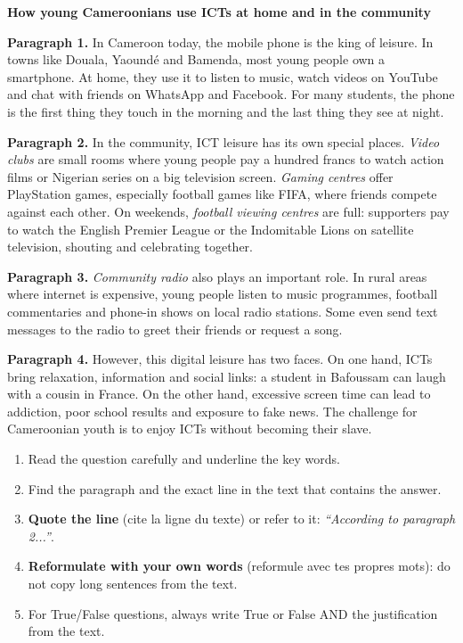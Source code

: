 \documentclass[11pt]{article}
\newcounter{popsec}
\newcounter{popsub}
\newcommand{\courssub}[1]{%
  \stepcounter{popsub}%
  \par\vspace{9pt}\noindent{\popxbold\fontsize{11.5}{13}\selectfont\color{popink}{\color{poporange}\thepopsec.\thepopsub}\hspace{6pt}#1}\par\nopagebreak\vspace{4pt}
}
\begin{document}
\begin{exemplebox}
\textbf{How young Cameroonians use ICTs at home and in the community}

\textbf{Paragraph 1.} In Cameroon today, the mobile phone is the king of leisure. In towns like Douala, Yaoundé and Bamenda, most young people own a smartphone. At home, they use it to listen to music, watch videos on YouTube and chat with friends on WhatsApp and Facebook. For many students, the phone is the first thing they touch in the morning and the last thing they see at night.

\textbf{Paragraph 2.} In the community, ICT leisure has its own special places. \emph{Video clubs} are small rooms where young people pay a hundred francs to watch action films or Nigerian series on a big television screen. \emph{Gaming centres} offer PlayStation games, especially football games like FIFA, where friends compete against each other. On weekends, \emph{football viewing centres} are full: supporters pay to watch the English Premier League or the Indomitable Lions on satellite television, shouting and celebrating together.

\textbf{Paragraph 3.} \emph{Community radio} also plays an important role. In rural areas where internet is expensive, young people listen to music programmes, football commentaries and phone-in shows on local radio stations. Some even send text messages to the radio to greet their friends or request a song.

\textbf{Paragraph 4.} However, this digital leisure has two faces. On one hand, ICTs bring relaxation, information and social links: a student in Bafoussam can laugh with a cousin in France. On the other hand, excessive screen time can lead to addiction, poor school results and exposure to fake news. The challenge for Cameroonian youth is to enjoy ICTs without becoming their slave.
\end{exemplebox}

\courssub{Comprehension tasks}

\begin{methode}
\begin{enumerate}
\item Read the question carefully and underline the key words.
\item Find the paragraph and the exact line in the text that contains the answer.
\item \textbf{Quote the line} (cite la ligne du texte) or refer to it: \emph{``According to paragraph 2...''}.
\item \textbf{Reformulate with your own words} (reformule avec tes propres mots): do not copy long sentences from the text.
\item For True/False questions, always write True or False AND the justification from the text.
\end{enumerate}
\end{methode}
\end{document}
